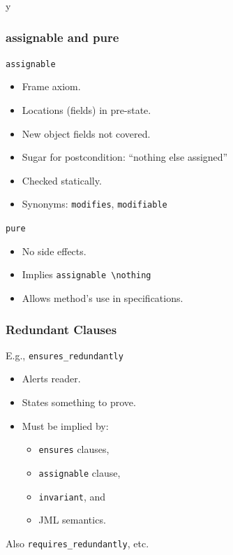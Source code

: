 \if y\MAKEHANDOUTS \documentclass[compress,landscape,handout]{beamer}
\begin{document}
\begin{frame}[fragile]
\frametitle{assignable and pure}

\lstinline!assignable!
\begin{itemize}
\item
Frame axiom.

\item
Locations (fields) in pre-state.

\item
New object fields not covered.

\item
Sugar for postcondition: ``nothing else assigned''

\item
Checked statically.

\item
Synonyms: \lstinline!modifies!, \lstinline!modifiable!
\end{itemize}

\lstinline!pure!
\begin{itemize}
\item
No side effects.

\item
Implies \lstinline!assignable \nothing!

\item
Allows method's use in specifications.
\end{itemize}
\end{frame}

\begin{frame}[fragile,label=redundantly]
\frametitle{Redundant Clauses}

E.g., \lstinline!ensures_redundantly!
\begin{itemize}
\item
Alerts reader.

\item
States something to prove.

\item
Must be implied by:
\begin{itemize}
\item
\lstinline!ensures! clauses,

\item
\lstinline!assignable! clause,

\item
\lstinline!invariant!, and

\item
JML semantics.
\end{itemize}
\end{itemize}

Also \lstinline!requires_redundantly!, etc.

\end{frame}
\end{document}
